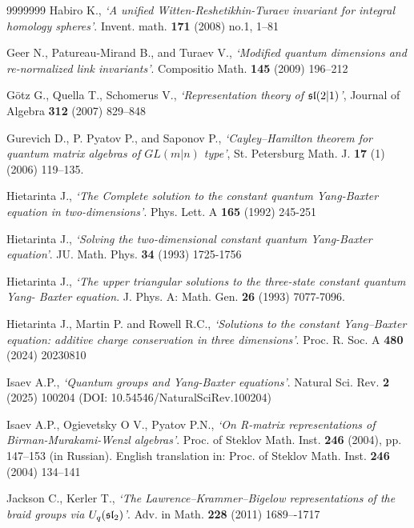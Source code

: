 \documentclass[11pt]{article}
\newcounter{theorem}\def\thetheorem{\thesection.\arabic{theorem}}\makeatletter
\begin{document}
\begin{thebibliography}{9999999}
  Habiro K., {\em `A unified Witten-Reshetikhin-Turaev invariant for integral homology spheres'}. Invent. math. {\bf 171} (2008) no.1, 1--81

  Geer N.,  Patureau-Mirand B., and Turaev V., {\em `Modified quantum dimensions and re-normalized link invariants'}.
Compositio Math. {\bf 145} (2009) 196--212

Götz G., Quella T., Schomerus V., {\em `Representation theory of $\frak{sl}(2|1)$'},
Journal of Algebra {\bf 312} (2007) 829--848


Gurevich D., P. Pyatov P., and Saponov P., {\em `Cayley–Hamilton theorem for quantum matrix algebras of $GL(m|n)$ type'}, St. Petersburg Math. J. {\bf 17} (1) (2006)
119–135.


  Hietarinta J., {\em `The Complete solution to the constant quantum Yang-Baxter equation in
two-dimensions'}. Phys. Lett. A {\bf 165} (1992) 245-251 

 Hietarinta J., {\em `Solving the two-dimensional constant quantum Yang-Baxter equation'}. JU. Math. Phys. {\bf 34}
(1993) 1725-1756

Hietarinta J.,  {\em `The upper triangular solutions to the three-state constant quantum Yang-
Baxter equation}. J. Phys. A: Math. Gen. {\bf 26} (1993) 7077-7096.

 Hietarinta J., Martin P. and Rowell R.C., {\em `Solutions to the constant Yang–Baxter equation: additive charge conservation in three dimensions'}. Proc. R. Soc. A {\bf 480} (2024) 20230810

  Isaev A.P., {\em `Quantum groups and Yang-Baxter equations'}.
Natural Sci. Rev. {\bf 2} (2025) 100204 
(DOI: 10.54546/NaturalSciRev.100204)

 Isaev A.P., Ogievetsky O V., Pyatov P.N., {\em `On R-matrix representations of
Birman-Murakami-Wenzl algebras'}. Proc. of Steklov Math. 
Inst. {\bf 246} (2004), pp. 147--153 (in Russian).
English translation in: Proc. of Steklov Math. Inst. {\bf 246} (2004) 134--141 

 Jackson C.,  Kerler T.,
{\em `The Lawrence–Krammer–Bigelow representations of
the braid groups via $U_q(\frak{sl}_2)$'}. Adv. in Math. {\bf 228} (2011) 1689–-1717
	

\end{thebibliography}
\end{document}
